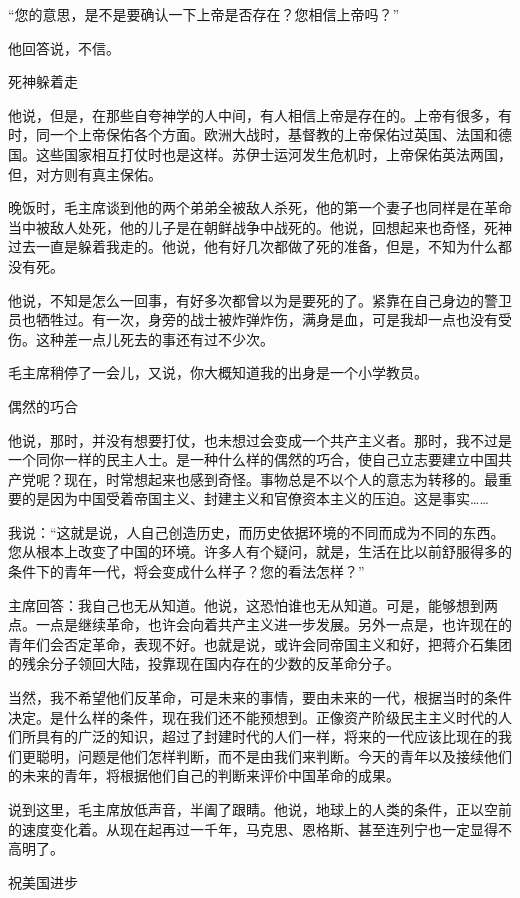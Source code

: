 “您的意思，是不是要确认一下上帝是否存在？您相信上帝吗？”

他回答说，不信。

死神躲着走

他说，但是，在那些自夸神学的人中间，有人相信上帝是存在的。上帝有很多，有时，同一个上帝保佑各个方面。欧洲大战时，基督教的上帝保佑过英国、法国和德国。这些国家相互打仗时也是这样。苏伊士运河发生危机时，上帝保佑英法两国，但，对方则有真主保佑。

晚饭时，毛主席谈到他的两个弟弟全被敌人杀死，他的第一个妻子也同样是在革命当中被敌人处死，他的儿子是在朝鲜战争中战死的。他说，回想起来也奇怪，死神过去一直是躲着我走的。他说，他有好几次都做了死的准备，但是，不知为什么都没有死。

他说，不知是怎么一回事，有好多次都曾以为是要死的了。紧靠在自己身边的警卫员也牺牲过。有一次，身旁的战士被炸弹炸伤，满身是血，可是我却一点也没有受伤。这种差一点儿死去的事还有过不少次。

毛主席稍停了一会儿，又说，你大概知道我的出身是一个小学教员。

偶然的巧合

他说，那时，并没有想要打仗，也未想过会变成一个共产主义者。那时，我不过是一个同你一样的民主人士。是一种什么样的偶然的巧合，使自己立志要建立中国共产党呢？现在，时常想起来也感到奇怪。事物总是不以个人的意志为转移的。最重要的是因为中国受着帝国主义、封建主义和官僚资本主义的压迫。这是事实……

我说：“这就是说，人自己创造历史，而历史依据环境的不同而成为不同的东西。您从根本上改变了中国的环境。许多人有个疑问，就是，生活在比以前舒服得多的条件下的青年一代，将会变成什么样子？您的看法怎样？”

主席回答：我自己也无从知道。他说，这恐怕谁也无从知道。可是，能够想到两点。一点是继续革命，也许会向着共产主义进一步发展。另外一点是，也许现在的青年们会否定革命，表现不好。也就是说，或许会同帝国主义和好，把蒋介石集团的残余分子领回大陆，投靠现在国内存在的少数的反革命分子。

当然，我不希望他们反革命，可是未来的事情，要由未来的一代，根据当时的条件决定。是什么样的条件，现在我们还不能预想到。正像资产阶级民主主义时代的人们所具有的广泛的知识，超过了封建时代的人们一样，将来的一代应该比现在的我们更聪明，问题是他们怎样判断，而不是由我们来判断。今天的青年以及接续他们的未来的青年，将根据他们自己的判断来评价中国革命的成果。

说到这里，毛主席放低声音，半阖了跟睛。他说，地球上的人类的条件，正以空前的速度变化着。从现在起再过一千年，马克思、恩格斯、甚至连列宁也一定显得不高明了。

祝美国进步

